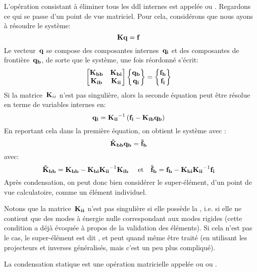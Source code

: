 L'opération consistant à éliminer tous les ddl internes est appelée
 ou .
\medskip
Regardons ce qui se passe d'un point de vue matriciel.
Pour cela, considérons que nous ayons à résoudre le système:
\begin{equation} \MM{K} \VV{q}=\VV{f}\end{equation}
Le vecteur~$\VV{q}$ se compose des composantes internes~$\VV{q_i}$ et des composantes
de frontière~$\VV{q_b}$, de sorte que le système, une fois réordonné s'écrit:
\begin{equation}
\MM*{\MM{K_{bb}} & \MM{K_{bi}}\\
\MM{K_{ib}} & \MM{K_{ii}}}
\VV*{\VV{q_b}\\\VV{q_i}}
=
\VV*{\VV{f_b}\\\VV{f_i}}
\end{equation}
Si la matrice~$\MM{K}_{ii}$ n'est pas singulière, alors la seconde équation peut être
résolue en terme de variables internes en:
\begin{equation}
\VV{q_i} = \MMI{K_{ii}}\left(\VV{f_i}-\MM{K_{ib}}\VV{q_b}\right)
\end{equation}
En reportant cela dans la première équation, on obtient le système avec :
\begin{equation}
\MM{\tilde{K}_{bb}}\VV{q_b} = \VV{\tilde{f}_b}
\end{equation}
avec:
\begin{equation}
\MM{\tilde{K}_{bb}}=\MM{K_{bb}} - \MM{K_{bi}}\MMI{K_{ii}}\MM{K_{ib}}
\quad \text{ et}\quad
\VV{\tilde{f}_b}=\VV{f_b} - \MM{K_{bi}}\MMI{K_{ii}}\VV{f_i}
\end{equation}
Après condensation, on peut donc bien considérer le super-élément, d'un point de vue calculatoire,
comme un élément individuel.

\medskip
Notons que la matrice~$\MM{K_{ii}}$ n'est pas singulière si elle possède la , i.e. si elle ne contient que des modes à énergie nulle correspondant aux
modes rigides (cette condition a déjà évoquée à propos de la validation des éléments).
Si cela n'est pas le cas, le super-élément est dit , et
peut quand même être traité (en utilisant les projecteurs et inverses généralisés,
mais c'est un peu plus compliqué).

La condensation statique est une opération matricielle
appelée  ou  ou
.

